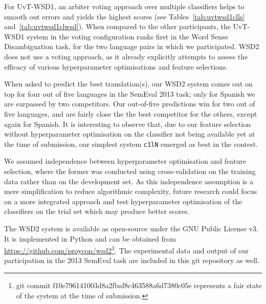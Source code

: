 For UvT-WSD1, an arbiter voting approach over multiple classifiers helps to smooth out errors
and yields the highest scores (see Tables~\ref{tab:uvtwsd1clls} and~\ref{tab:uvtwsd1clwsd}). When compared to the other
participants, the UvT-WSD1 system in the voting configuration ranks first in
the Word Sense Disambiguation task, for the two language pairs in which we
participated. WSD2 does not use a voting approach, as it already explicitly
attempts to assess the efficacy of various hyperparameter optimisations and
feature selections.

When asked to predict the best translation(s), our WSD2 system comes out on top
for four out of five languages in the SemEval 2013 task; only for Spanish we
are surpassed by two competitors. Our out-of-five predictions win for two out
of five languages, and are fairly close the the best competitor for the others,
except again for Spanish. It is interesting to observe that, due to our feature
selection without hyperparameter optimisation on the classifier not being
available yet at the time of submission, our simplest system \texttt{c1lN}
emerged as best in the contest.

We assumed independence between hyperparameter optimisation and feature
selection, where the former was conducted using cross-validation on the
training data rather than on the development set. As this independence
assumption is a mere simplification to reduce algorithmic complexity, future
research could focus on a more integrated approach and test hyperparameter
optimisation of the classifiers on the trial set which may produce better
scores.

The WSD2 system is available as open-source under the GNU Public License v3. It
is implemented in Python \citep{PYTHON} and can be obtained from
\url{https://github.com/proycon/wsd2}\footnote{git commit
f10e796141003d8a2fbaf8c463588a6d7380c05e represents a fair state of the system
at the time of submission.}. The experimental data and output of our
participation in the 2013 SemEval task are included in
this git repository as well.

